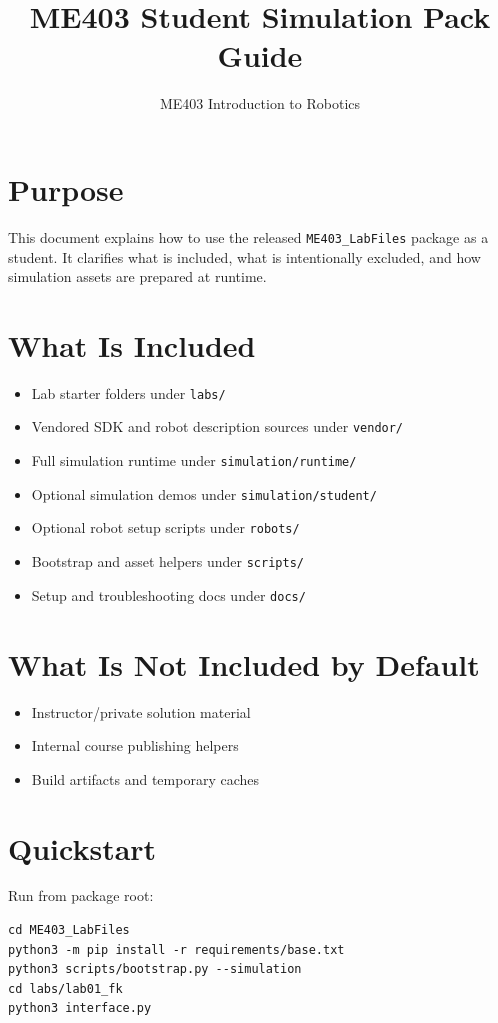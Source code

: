 \documentclass[11pt,a4paper]{article}
\title{ME403 Student Simulation Pack Guide}
\author{ME403 Introduction to Robotics}
\date{}
\begin{document}
\maketitle

\section{Purpose}
This document explains how to use the released \texttt{ME403\_LabFiles} package
as a student. It clarifies what is included, what is intentionally excluded, and
how simulation assets are prepared at runtime.

\section{What Is Included}
\begin{itemize}
  \item Lab starter folders under \texttt{labs/}
  \item Vendored SDK and robot description sources under \texttt{vendor/}
  \item Full simulation runtime under \texttt{simulation/runtime/}
  \item Optional simulation demos under \texttt{simulation/student/}
  \item Optional robot setup scripts under \texttt{robots/}
  \item Bootstrap and asset helpers under \texttt{scripts/}
  \item Setup and troubleshooting docs under \texttt{docs/}
\end{itemize}

\section{What Is Not Included by Default}
\begin{itemize}
  \item Instructor/private solution material
  \item Internal course publishing helpers
  \item Build artifacts and temporary caches
\end{itemize}

\section{Quickstart}
Run from package root:
\begin{verbatim}
cd ME403_LabFiles
python3 -m pip install -r requirements/base.txt
python3 scripts/bootstrap.py --simulation
cd labs/lab01_fk
python3 interface.py
\end{verbatim}
\end{document}
